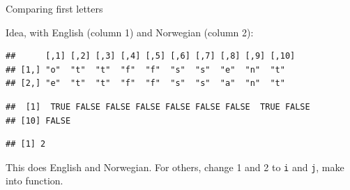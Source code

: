 \begin{frame}[fragile]{Comparing first letters}

Idea, with English (column 1) and Norwegian (column 2):




\begin{knitrout}\footnotesize
{}\color{fgcolor}\begin{kframe}
\begin{alltt}
\hlstd{(lang.init[,}\hlstd{],lang.init[,}\hlstd{])}
\end{alltt}
\begin{verbatim}
##      [,1] [,2] [,3] [,4] [,5] [,6] [,7] [,8] [,9] [,10]
## [1,] "o"  "t"  "t"  "f"  "f"  "s"  "s"  "e"  "n"  "t"  
## [2,] "e"  "t"  "t"  "f"  "f"  "s"  "s"  "a"  "n"  "t"
\end{verbatim}
\begin{alltt}
\hlkwb{=}\hlstd{(lang.init[,}\hlstd{]}\hlopt{!=}\hlstd{lang.init[,}\hlstd{])}
\end{alltt}
\begin{verbatim}
##  [1]  TRUE FALSE FALSE FALSE FALSE FALSE FALSE  TRUE FALSE
## [10] FALSE
\end{verbatim}
\begin{alltt}
\end{alltt}
\begin{verbatim}
## [1] 2
\end{verbatim}
\end{kframe}
\end{knitrout}

This does English and Norwegian. For others, change 1 and 2 to
\texttt{i} and \texttt{j}, make into function.
  
\end{frame}

